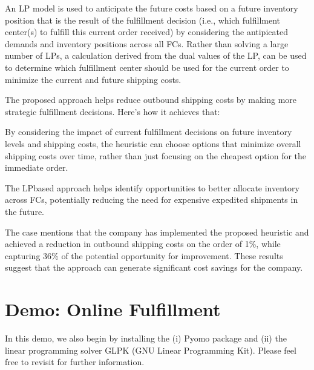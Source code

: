 \documentclass[letterpaper,10pt,english]{jupyterBook}
\begin{document}
\sphinxAtStartPar
{} An LP model is used to anticipate the future costs based on a future inventory position that is the result of the fulfillment decision (i.e., which fulfillment center(s) to fulfill this current order received) by considering the antipicated demands and inventory positions across all FCs. Rather than solving a large number of LPs, a calculation derived from the dual values of the LP, can be used to determine which fulfillment center should be used for the current order to minimize the current and future shipping costs.

\sphinxAtStartPar
{}

\sphinxAtStartPar
The proposed approach helps reduce outbound shipping costs by making more strategic fulfillment decisions. Here’s how it achieves that:

\sphinxAtStartPar
{} By considering the impact of current fulfillment decisions on future inventory levels and shipping costs, the heuristic can choose options that minimize overall shipping costs over time, rather than just focusing on the cheapest option for the immediate order.

\sphinxAtStartPar
{} The LP\sphinxhyphen{}based approach helps identify opportunities to better allocate inventory across FCs, potentially reducing the need for expensive expedited shipments in the future.

\sphinxAtStartPar
The case mentions that the company has implemented the proposed heuristic and achieved a reduction in outbound shipping costs on the order of 1\%, while capturing 36\% of the potential opportunity for improvement. These results suggest that the approach can generate significant cost savings for the company.

\sphinxstepscope


\section{Demo: Online Fulfillment}
\label{\detokenize{docs/Case2_1_Module1_Online_Fulfillment_Script:demo-online-fulfillment}}\label{\detokenize{docs/Case2_1_Module1_Online_Fulfillment_Script::doc}}
\sphinxAtStartPar
In this demo, we also begin by installing the (i) Pyomo package and (ii) the linear programming solver GLPK (GNU Linear Programming Kit). Please feel free to revisit  for further information.
\end{document}
